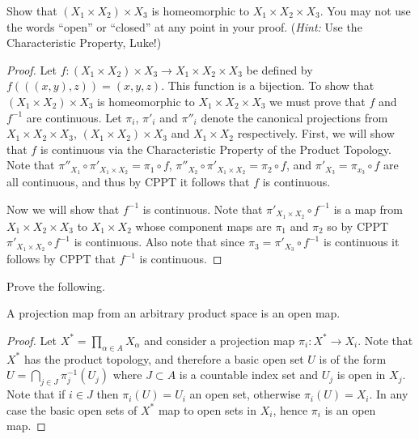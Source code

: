 \documentclass[minion]{homework651}
\begin{document}
\begin{problems}
\problem Show that $(X_1\times X_2)\times X_3$ is homeomorphic to $X_1\times X_2 \times X_3$.
You may not use the words ``open'' or ``closed'' at any point in your proof.  (\textit{Hint:} Use the Characteristic Property, Luke!)
\begin{proof}
    Let $f: (X_1\times X_2)\times X_3 \to X_1\times X_2 \times X_3$ be defined by $f(((x, y), z)) = (x, y, z)$. This function is a bijection.
    To show that $(X_1\times X_2)\times X_3$ is homeomorphic to $X_1\times X_2 \times X_3$ we must prove that $f$ and $f^{-1}$ are continuous. Let $\pi_{i}$, $\pi'_i$ and $\pi''_i$ denote the canonical projections from 
    $X_1\times X_2 \times X_3$, $(X_1\times X_2)\times X_3$ and $X_1\times X_2$ respectively. First, we will show that $f$ is continuous via the Characteristic Property of the Product Topology. 
    Note that $\pi''_{X_1}\circ\pi'_{X_1 \times X_2} = \pi_1 \circ f$, $\pi''_{X_2}\circ\pi'_{X_1 \times X_2} = \pi_2 \circ f$, and $\pi'_{X_3} = \pi_{x_3}\circ f$ are all continuous, and thus by CPPT
    it follows that $f$ is continuous.  

    
    Now we will show that $f^{-1}$ is continuous. Note that $\pi'_{X_1 \times X_2}\circ f^{-1}$ is a map from $X_1 \times X_2 \times X_3$ to $X_1 \times X_2$ whose component maps are $\pi_1$ and $\pi_2$
    so by CPPT $\pi'_{X_1 \times X_2}\circ f^{-1}$ is continuous. Also note that since $\pi_3 = \pi'_{X_3} \circ f^{-1}$ is continuous it follows by CPPT that $f^{-1}$ is continuous. 

\end{proof}

\problem Prove the following.
\begin{subproblems}

\item A projection map from an arbitrary product space is an open map.
\begin{proof}
    Let $X^* = \prod_{\alpha \in A} X_\alpha$ and consider a projection map $\pi_i: X^* \to X_i$. Note that $X^*$ has the 
    product topology, and therefore a basic open set $U$ is of the form $U  = \bigcap_{j \in J} \pi^{-1}_j(U_j)$ where $J \subset A$ is 
    a countable index set and $U_j$ is open in $X_j$. Note that if $i \in J$ then $\pi_i(U) = U_i$ an open set, otherwise $\pi_i(U) = X_i$.
    In any case the basic open sets of $X^*$ map to open sets in $X_i$, hence $\pi_i$ is an open map. 
\end{proof}


\end{subproblems}
\end{problems}
\end{document}
